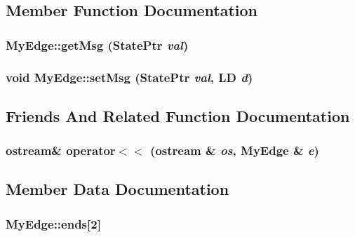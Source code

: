 \subsection{Member Function Documentation}
\subsubsection{ MyEdge::getMsg ({\bf StatePtr} {\em val})\hspace{0.3cm}{\tt  [inline]}}\label{structMyEdge_9e32cab50a3f3bfc2e362f2f1943af4a}


\subsubsection{\setlength{\rightskip}{0pt plus 5cm}void MyEdge::setMsg ({\bf StatePtr} {\em val}, {\bf LD} {\em d})\hspace{0.3cm}{\tt  [inline]}}\label{structMyEdge_e0889d6843138a8782cb8b70516a8301}




\subsection{Friends And Related Function Documentation}
\subsubsection{\setlength{\rightskip}{0pt plus 5cm}ostream\& operator$<$$<$ (ostream \& {\em os}, {\bf MyEdge} \& {\em e})\hspace{0.3cm}{\tt  [friend]}}\label{structMyEdge_62df515d472be9c0e91bd9f5350a7675}




\subsection{Member Data Documentation}
\subsubsection{ {\bf MyEdge::ends}[2]}\label{structMyEdge_b6fb1f7eaa15a3136087c8551f9ce8d6}


